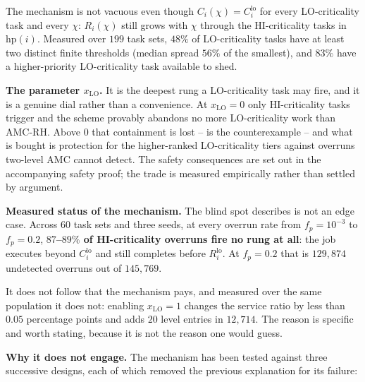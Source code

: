 The mechanism is not vacuous even though $C_i(\chi) = C_i^{\mathrm{lo}}$ for
every LO-criticality task and every $\chi$: $R_i(\chi)$ still grows with $\chi$
through the HI-criticality tasks in $\mathrm{hp}(i)$. Measured over $199$ task
sets, $48\%$ of LO-criticality tasks have at least two distinct finite
thresholds (median spread $56\%$ of the smallest), and $83\%$ have a
higher-priority LO-criticality task available to shed.

\textbf{The parameter $x_{\mathrm{LO}}$.} It is the deepest rung a
LO-criticality task may fire, and it is a genuine dial rather than a
convenience. At $x_{\mathrm{LO}} = 0$ only HI-criticality tasks trigger and the
scheme provably abandons no more LO-criticality work than AMC-RH. Above $0$
that containment is lost --  is the counterexample --
and what is bought is protection for the higher-ranked LO-criticality tiers
against overruns two-level AMC cannot detect. The safety consequences are set
out in the accompanying safety proof; the trade is measured empirically rather
than settled by argument.

\textbf{Measured status of the mechanism.} The blind spot
 describes is not an edge case. Across 60 task sets and
three seeds, at every overrun rate from $f_p = 10^{-3}$ to $f_p = 0.2$,
\textbf{$87$--$89\%$ of HI-criticality overruns fire no rung at all}: the job
executes beyond $C_i^{\mathrm{lo}}$ and still completes before
$R_i^{\mathrm{lo}}$. At $f_p = 0.2$ that is $129{,}874$ undetected overruns out
of $145{,}769$.

It does not follow that the mechanism pays, and measured over the same
population it does not: enabling $x_{\mathrm{LO}} = 1$ changes the service
ratio by less than $0.05$ percentage points and adds $20$ level entries in
$12{,}714$. The reason is specific and worth stating, because it is not the
reason one would guess.

\textbf{Why it does not engage.} The mechanism has been tested against three
successive designs, each of which removed the previous explanation for its
failure:

